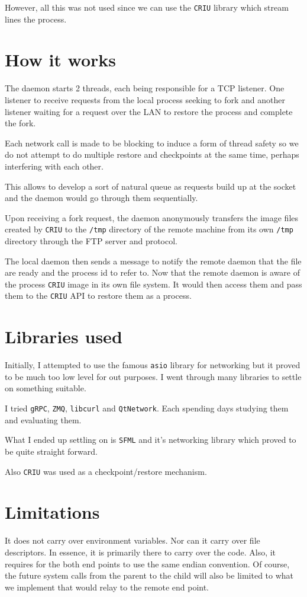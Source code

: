 \documentclass{article}
\begin{document}
However, all this was not used since we can use the \verb|CRIU| library which stream lines the process.

\section{How it works}
The daemon starts 2 threads, each being responsible for a TCP listener. One listener to receive requests from the local process seeking to fork and another listener waiting for a request over the LAN to restore the process and complete the fork.

Each network call is made to be blocking to induce a form of thread safety so we do not attempt to do multiple restore and checkpoints at the same time, perhaps interfering with each other.

This allows to develop a sort of natural queue as requests build up at the socket and the daemon would go through them sequentially.

Upon receiving a fork request, the daemon anonymously transfers the image files created by \verb|CRIU| to the \verb|/tmp| directory of the remote machine from its own \verb|/tmp| directory through the FTP server and protocol.

The local daemon then sends a message to notify the remote daemon that the file are ready and the process id to refer to.
Now that the remote daemon is aware of the process \verb|CRIU| image in its own file system.
It would then access them and pass them to the \verb|CRIU| API to restore them as a process.

\section{Libraries used}

Initially, I attempted to use the famous \verb|asio| library for networking but it proved to be much too low level for out purposes.
I went through many libraries to settle on something suitable.

I tried \verb|gRPC|, \verb|ZMQ|, \verb|libcurl| and \verb|QtNetwork|. Each spending days studying them and evaluating them.

What I ended up settling on is \verb|SFML| and it's networking library which proved to be quite straight forward.

Also \verb|CRIU| was used as a checkpoint/restore mechanism.

\section{Limitations}

It does not carry over environment variables.
Nor can it carry over file descriptors.
In essence, it is primarily there to carry over the code.
Also, it requires for the both end points to use the same endian convention.
Of course, the future system calls from the parent to the child will also be limited to what we implement that would relay to the remote end point.
\end{document}
